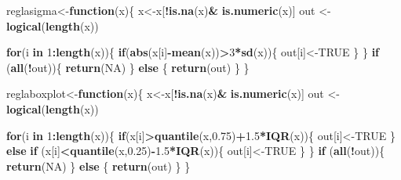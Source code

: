 \documentclass[notspecified,article,submit,moreauthors,pdftex]{Definitions/mdpi}
\newenvironment{Shaded}{\begin{snugshade}}{\end{snugshade}}
\newcommand{\ConstantTok}[1]{\textcolor[rgb]{0.56,0.35,0.01}{#1}}
\newcommand{\ControlFlowTok}[1]{\textcolor[rgb]{0.13,0.29,0.53}{\textbf{#1}}}
\newcommand{\DecValTok}[1]{\textcolor[rgb]{0.00,0.00,0.81}{#1}}
\newcommand{\FloatTok}[1]{\textcolor[rgb]{0.00,0.00,0.81}{#1}}
\newcommand{\FunctionTok}[1]{\textcolor[rgb]{0.13,0.29,0.53}{\textbf{#1}}}
\newcommand{\NormalTok}[1]{#1}
\newcommand{\OtherTok}[1]{\textcolor[rgb]{0.56,0.35,0.01}{#1}}
\newcommand{\SpecialCharTok}[1]{\textcolor[rgb]{0.81,0.36,0.00}{\textbf{#1}}}
\begin{document}
\begin{Shaded}
\begin{Highlighting}[]
\NormalTok{reglasigma}\OtherTok{\textless{}{-}}\ControlFlowTok{function}\NormalTok{(x)\{}
\NormalTok{  x}\OtherTok{\textless{}{-}}\NormalTok{x[}\SpecialCharTok{!}\FunctionTok{is.na}\NormalTok{(x)}\SpecialCharTok{\&} \FunctionTok{is.numeric}\NormalTok{(x)]}
\NormalTok{  out }\OtherTok{\textless{}{-}} \FunctionTok{logical}\NormalTok{(}\FunctionTok{length}\NormalTok{(x)) }
  
  \ControlFlowTok{for}\NormalTok{(i }\ControlFlowTok{in} \DecValTok{1}\SpecialCharTok{:}\FunctionTok{length}\NormalTok{(x))\{}
    \ControlFlowTok{if}\NormalTok{(}\FunctionTok{abs}\NormalTok{(x[i]}\SpecialCharTok{{-}}\FunctionTok{mean}\NormalTok{(x))}\SpecialCharTok{\textgreater{}}\DecValTok{3}\SpecialCharTok{*}\FunctionTok{sd}\NormalTok{(x))\{}
\NormalTok{      out[i]}\OtherTok{\textless{}{-}}\ConstantTok{TRUE}
\NormalTok{    \}}
\NormalTok{  \}}
  \ControlFlowTok{if}\NormalTok{ (}\FunctionTok{all}\NormalTok{(}\SpecialCharTok{!}\NormalTok{out))\{}
    \FunctionTok{return}\NormalTok{(}\ConstantTok{NA}\NormalTok{)}
\NormalTok{  \} }\ControlFlowTok{else}\NormalTok{ \{}
    \FunctionTok{return}\NormalTok{(out)}
\NormalTok{  \}}
\NormalTok{\}}

\NormalTok{reglaboxplot}\OtherTok{\textless{}{-}}\ControlFlowTok{function}\NormalTok{(x)\{}
\NormalTok{  x}\OtherTok{\textless{}{-}}\NormalTok{x[}\SpecialCharTok{!}\FunctionTok{is.na}\NormalTok{(x)}\SpecialCharTok{\&} \FunctionTok{is.numeric}\NormalTok{(x)]}
\NormalTok{  out }\OtherTok{\textless{}{-}} \FunctionTok{logical}\NormalTok{(}\FunctionTok{length}\NormalTok{(x)) }
  
  \ControlFlowTok{for}\NormalTok{(i }\ControlFlowTok{in} \DecValTok{1}\SpecialCharTok{:}\FunctionTok{length}\NormalTok{(x))\{}
    \ControlFlowTok{if}\NormalTok{(x[i]}\SpecialCharTok{\textgreater{}}\FunctionTok{quantile}\NormalTok{(x,}\FloatTok{0.75}\NormalTok{)}\SpecialCharTok{+}\FloatTok{1.5}\SpecialCharTok{*}\FunctionTok{IQR}\NormalTok{(x))\{}
\NormalTok{      out[i]}\OtherTok{\textless{}{-}}\ConstantTok{TRUE}
\NormalTok{    \} }\ControlFlowTok{else} \ControlFlowTok{if}\NormalTok{ (x[i]}\SpecialCharTok{\textless{}}\FunctionTok{quantile}\NormalTok{(x,}\FloatTok{0.25}\NormalTok{)}\SpecialCharTok{{-}}\FloatTok{1.5}\SpecialCharTok{*}\FunctionTok{IQR}\NormalTok{(x))\{}
\NormalTok{      out[i]}\OtherTok{\textless{}{-}}\ConstantTok{TRUE}
\NormalTok{    \}}
\NormalTok{  \}}
  \ControlFlowTok{if}\NormalTok{ (}\FunctionTok{all}\NormalTok{(}\SpecialCharTok{!}\NormalTok{out))\{}
    \FunctionTok{return}\NormalTok{(}\ConstantTok{NA}\NormalTok{)}
\NormalTok{  \} }\ControlFlowTok{else}\NormalTok{ \{}
    \FunctionTok{return}\NormalTok{(out)}
\NormalTok{  \}}
\NormalTok{\}}
\end{Highlighting}
\end{Shaded}
\end{document}
